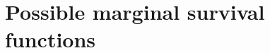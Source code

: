 \documentclass[a4paper,10pt]{article}
\begin{document}
\section*{Possible marginal survival functions}
\end{document}
